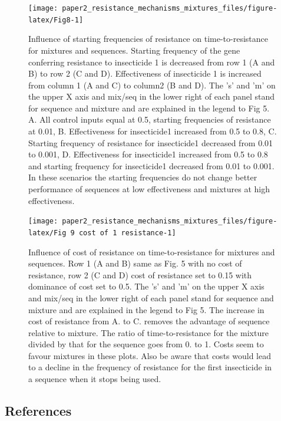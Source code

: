 \documentclass[11pt,]{article}
\begin{document}
\begin{figure}

\texttt{[image: paper2\_resistance\_mechanisms\_mixtures\_files/figure-latex/Fig8-1]} \hfill{}

\caption{Influence of starting frequencies of resistance on time-to-resistance for mixtures and sequences. Starting frequency of the gene conferring resistance to insecticide 1 is decreased from row 1 (A and B) to row 2 (C and D). Effectiveness of insecticide 1 is increased from column 1 (A and C) to column2 (B and D). The 's' and 'm' on the upper X axis and mix/seq in the lower right of each panel stand for sequence and mixture and are explained in the legend to Fig 5. A. All control inputs equal at 0.5, starting frequencies of resistance at 0.01, B. Effectiveness for insecticide1 increased from 0.5 to 0.8, C. Starting frequency of resistance for insecticide1 decreased from 0.01 to 0.001, D. Effectiveness for insecticide1 increased from 0.5 to 0.8 and starting frequency for insecticide1 decreased from 0.01 to 0.001. In these scenarios the starting frequencies do not change better performance of sequences at low effectiveness and mixtures at high effectiveness.}\label{fig:Fig8}
\end{figure}

\begin{figure}

\texttt{[image: paper2\_resistance\_mechanisms\_mixtures\_files/figure-latex/Fig 9 cost of 1 resistance-1]} \hfill{}

\caption{Influence of cost of resistance on time-to-resistance for mixtures and sequences. Row 1 (A and B) same as Fig. 5 with no cost of resistance, row 2 (C and D) cost of resistance set to 0.15 with dominance of cost set to 0.5. The 's' and 'm' on the upper X axis and mix/seq in the lower right of each panel stand for sequence and mixture and are explained in the legend to Fig 5. The increase in cost of resistance from A. to C. removes the advantage of sequence relative to mixture. The ratio of time-to-resistance for the mixture divided by that for the sequence goes from 0. to 1. Costs seem to favour mixtures in these plots. Also be aware that costs would lead to a decline in the frequency of resistance for the first insecticide in a sequence when it stops being used.}\label{fig:Fig 9 cost of 1 resistance}
\end{figure}

\pagebreak

\subsection{References}\label{references}
\end{document}
